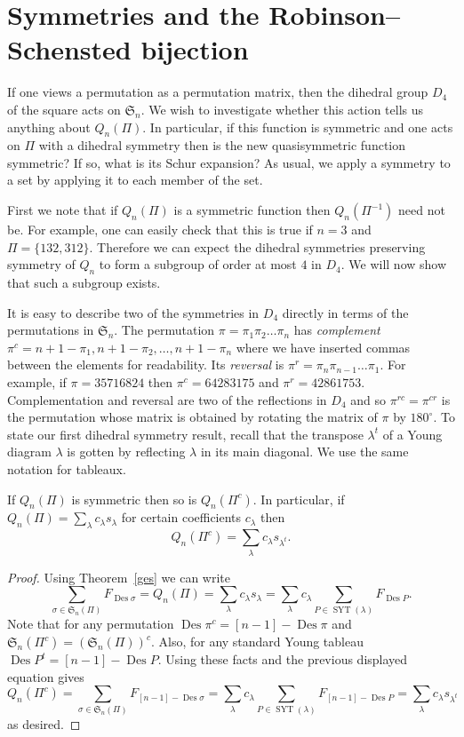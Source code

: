 \documentclass[ALCO,ThmDefs,Unicode,epreuves]{cedram}
\newcommand{\la}{\lambda}
\newcommand{\si}{\sigma}
\newcommand{\fS}{{\mathfrak S}}
\DeclareMathOperator{\Des}{Des}
\DeclareMathOperator{\SYT}{SYT}
\begin{document}
\section{Symmetries and the Robinson--Schensted bijection}

If one views a permutation as a permutation matrix, then the dihedral group $D_4$ of the square acts on $\fS_n$. We wish to investigate whether this action tells us anything about $Q_n(\Pi)$. In particular, if this function is symmetric and one acts on $\Pi$ with a dihedral symmetry then is the new quasisymmetric function symmetric? If so, what is its Schur expansion? As usual, we apply a symmetry to a set by applying it to each member of the set.

First we note that if $Q_n(\Pi)$ is a symmetric function then $Q_n(\Pi^{-1})$ need not be. For example, one can easily check that this is true if $n=3$ and $\Pi=\{132, 312\}$. Therefore we can expect the dihedral symmetries preserving symmetry of $Q_n$ to form a subgroup of order at most $4$ in $D_4$. We will now show that such a subgroup exists.

It is easy to describe two of the symmetries in $D_4$ directly in terms of the permutations in $\fS_n$. The permutation $\pi=\pi_1\pi_2\dots\pi_n$ has \emph{complement} $\pi^c = n+1-\pi_1, n+1-\pi_2,\dots,n+1-\pi_n$ where we have inserted commas between the elements for readability. Its \emph{reversal} is $\pi^r = \pi_n\pi_{n-1}\dots\pi_1$. For example, if $\pi=35716824$ then $\pi^c = 64283175$ and $\pi^r = 42861753$. Complementation and reversal are two of the reflections in $D_4$ and so $\pi^{rc}=\pi^{cr}$ is the permutation whose matrix is obtained by rotating the matrix of $\pi$ by $180^\circ$. To state our first dihedral symmetry result, recall that the transpose $\la^t$ of a Young diagram $\la$ is gotten by reflecting $\la$ in its main diagonal. We use the same notation for tableaux.

\begin{prop}
\label{c}
If $Q_n(\Pi)$ is symmetric then so is $Q_n(\Pi^c)$. In particular, if $Q_n(\Pi)=\sum_\la c_\la s_\la$ for certain coefficients $c_\la$ then
\[
Q_n(\Pi^c)=\sum_\la c_\la s_{\la^t}.
\]
\end{prop}
\begin{proof}
Using Theorem~\ref{ges} we can write
\[
\sum_{\si\in\fS_n(\Pi)} F_{\Des\si} = Q_n(\Pi) = \sum_\la c_\la s_\la= \sum_\la c_\la \sum_{P\in\SYT(\la)} F_{\Des P}.
\]
Note that for any permutation $\Des \pi^c =[n-1]-\Des\pi$ and $\fS_n(\Pi^c)=(\fS_n(\Pi))^c$. Also,
for any standard Young tableau $\Des P^t = [n-1]-\Des P$. Using these facts and the previous displayed equation gives
\[
Q_n(\Pi^c)=\sum_{\si\in\fS_n(\Pi)} F_{[n-1]-\Des\si} = \sum_\la c_\la \sum_{P\in\SYT(\la)} F_{[n-1]-\Des P}=\sum_\la c_\la s_{\la^t}
\]
as desired.
\end{proof}
\end{document}
